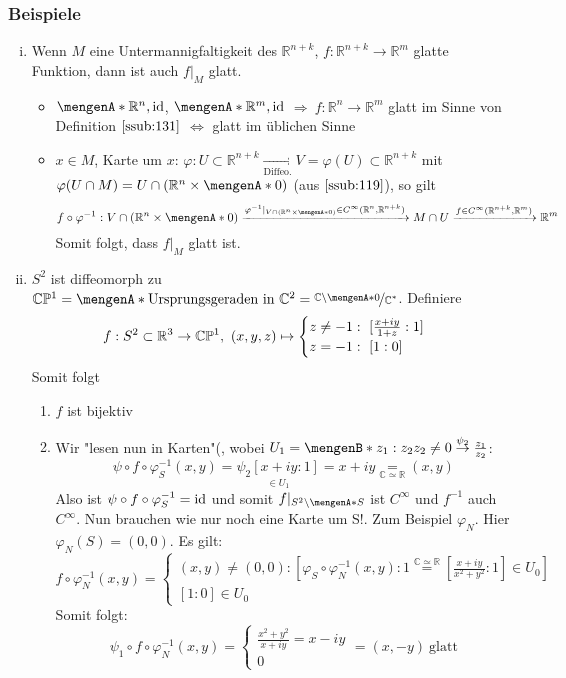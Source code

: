 \subsubsection{Beispiele}
\label{ssub:134}
\begin{enumerate}[(i)]
\item Wenn $M$ eine Untermannigfaltigkeit des $\mathds{R}^{n+k}$, $f:\mathds{R}^{n+k}\to \mathds{R}^m$ glatte Funktion, dann ist auch $f\vert_M$ glatt.
\begin{itemize}
\item $\set{\mathds{R}^n,\id}$, $\set{\mathds{R}^m,\id}$ $\Rightarrow\ f:\mathds{R}^n\to \mathds{R}^m$ glatt im Sinne von Definition $\ref{ssub:131}$ $\Leftrightarrow$ glatt im üblichen Sinne
\item $x\in M$, Karte um $x$: $\varphi: U\subset \mathds{R}^{n+k} \underset{\text{Diffeo.}}{\to} V = \varphi(U)\subset \mathds{R}^{n+k}$ mit $\varphi(U\cap M) = U\cap (\mathds{R}^n\times \set{0})$ (aus $\ref{ssub:119}$), so gilt
\[
f\circ \varphi^{-1}: V\cap (\mathds{R}^n\times \set{0}) \xrightarrow{\varphi^{-1} \vert_{V\cap (\mathds{R}^n\times \set{0})}\in C^{\infty}(\mathds{R}^n,\mathds{R}^{n+k})} 
M\cap U \xrightarrow{f \in C^{\infty}(\mathds{R}^{n+k},\mathds{R}^m)} \mathds{R}^m
\]
Somit folgt, dass $f\vert_M$ glatt ist. 
\end{itemize}
\item $S^2$ ist diffeomorph zu $\mathds{C}\mathds{P}^1 = \set{\text{Ursprungsgeraden in}\ \mathds{C}^2} = \nicefrac{\mathds{C}\backslash \set{0}}{\mathds{C}^*}$. Definiere 
\[
f: S^2\subset \mathbb{R}^3 \to \mathbb{C}\mathbb{P}^1,\ (x,y,z) \mapsto
\begin{cases}
z\neq -1:\ [\frac{x+iy}{1+z}:1]\\
z = -1:\ [1:0]
\end{cases}
\]
Somit folgt
\begin{enumerate}[(1)]
\item $f$ ist bijektiv
\item Wir "lesen nun in Karten"(, wobei $U_1 = \set[ z_1:z_2 ]{z_2\neq 0} \overset{\psi_2}{\to} \frac{z_1}{z_2}$:
\[
\psi \circ f \circ \varphi_S^{-1}(x,y) = \underset{\in U_1}{\psi_2 [x+iy:1]} = x + iy \underset{\mathds{C} \simeq \mathds{R}}{=} (x,y)
\]
Also ist $\psi \circ f \circ \varphi_S^{-1} = \operatorname{id}$ und somit $f \vert_{S^2\backslash\set{S}}$ ist $C^{\infty}$ und $f^{-1}$ auch $C^{\infty}$. Nun brauchen wie nur noch eine Karte um S!. Zum Beispiel $\varphi_N$. Hier $\varphi_N(S) = (0,0)$. Es gilt:
\[
	f\circ \varphi_N^{-1}(x,y) = 
	\begin{cases}
		(x,y) \neq (0,0): [\varphi_S \circ \varphi_N^{-1}(x,y):1 \overset{\mathds{C} \simeq \mathds{R}}{=} [\frac{x+iy}{x^2+y^2}:1] \in U_0]\\
	[1:0] \in U_0 
	\end{cases}
\]
Somit folgt:
\[
	\psi_1 \circ f \circ \varphi_N^{-1}(x,y) =
	\begin{cases}
		\frac{x^2+y^2}{x+iy} = x-iy\\
		0
	\end{cases}
	= (x,-y)\ \text{glatt}
\]
\end{enumerate}
\end{enumerate}

